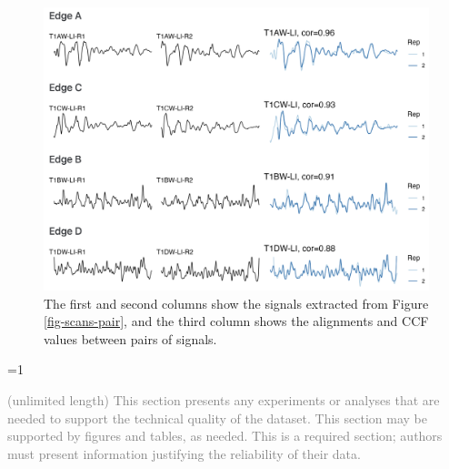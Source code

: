 \documentclass[fleqn,10pt]{wlscirep}
\newcommand{\ifinstruction}{0} %
\begin{document}
\begin{figure}[ht]
\centering
\includegraphics[width=0.8\linewidth]{signals_pair_alignment.png}
\caption{The first and second columns show the signals extracted from Figure \ref{fig-scans-pair}, and the third column shows the alignments and CCF values between pairs of signals.}
\label{fig-signals-pair-alignment}
\end{figure}

\ifnum \ifinstruction=1

\textcolor{gray}{(unlimited length) This section presents any experiments or analyses that are needed to support the technical quality of the dataset. This section may be supported by figures and tables, as needed. This is a required section; authors must present information justifying the reliability of their data.}
\end{document}

